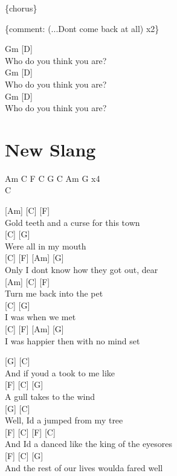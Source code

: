 \documentclass[
  letterpaper,
]{scrbook}
\begin{document}
\{chorus\}

\{comment: (...Don\textquotesingle t come back at all) x2\}

Gm {[}D{]}\\
Who do you think you are?\\
Gm {[}D{]}\\
Who do you think you are?\\
Gm {[}D{]}\\
Who do you think you are?

\hypertarget{new-slang}{%
\chapter{New Slang}\label{new-slang}}

Am C F C G C Am G x4\\
C

{[}Am{]} {[}C{]} {[}F{]}\\
Gold teeth and a curse for this town\\
{[}C{]} {[}G{]}\\
Were all in my mouth\\
{[}C{]} {[}F{]} {[}Am{]} {[}G{]}\\
Only I don\textquotesingle t know how they got out, dear\\
{[}Am{]} {[}C{]} {[}F{]}\\
Turn me back into the pet\\
{[}C{]} {[}G{]}\\
I was when we met\\
{[}C{]} {[}F{]} {[}Am{]} {[}G{]}\\
I was happier then with no mind set

{[}G{]} {[}C{]}\\
And if you\textquotesingle d a took to me like\\
{[}F{]} {[}C{]} {[}G{]}\\
A gull takes to the wind\\
{[}G{]} {[}C{]}\\
Well, I\textquotesingle d a jumped from my tree\\
{[}F{]} {[}C{]} {[}F{]} {[}C{]}\\
And I\textquotesingle d a danced like the king of the eyesores\\
{[}F{]} {[}C{]} {[}G{]}\\
And the rest of our lives would\textquotesingle a fared well
\end{document}
